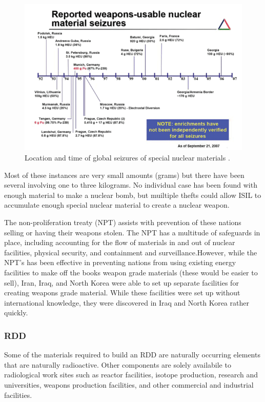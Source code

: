 \documentclass{report}
\begin{document}
\begin{figure}[h]
 \centering
 \includegraphics[trim = 0cm 0cm 0cm 0cm, clip,scale=0.7]{./figures/seizures.png}
   \caption{Location and time of global seizures of special nuclear materials \cite{Muller2007}.}
     \label{fig:seizures}
\end{figure}


Most of these instances are very small amounts (grams) but there have been several involving one to three kilograms. No individual case has been found with enough material to make a nuclear bomb, but muiltiple thefts could allow ISIL to accumulate enough special nuclear material to create a nuclear weapon. 

The non-proliferation treaty (NPT) assists with prevention of these nations selling or having their weapons stolen. The NPT has a multitude of safeguards in place, including accounting for the flow of materials in and out of nuclear facilities, physical security, and containment and surveillance.However, while the NPT's has been effective in preventing nations from using existing energy facilities to make off the books weapon grade materials (these would be easier to sell), Iran, Iraq, and North Korea were able to set up separate facilities for creating weapons grade material. While these facilities were set up without international knowledge, they were discovered in Iraq and North Korea rather quickly.


\subsubsection{RDD}
 Some of the materials required to build an RDD are naturally occurring elements that are naturally radioactive. Other components are solely availabile to radiological work sites such as reactor facilities, isotope production, research and universities, weapons production facilities, and other commercial and industrial facilities. 
\end{document}
